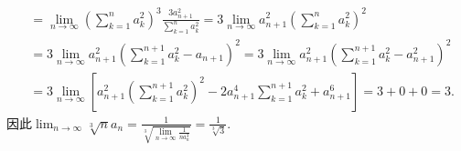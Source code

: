 \documentclass[../../main.tex]{subfiles}
\begin{document}
\begin{solution}
\begin{align*}
&=\lim_{n\rightarrow\infty}\left(\sum\limits_{k = 1}^n{a_{k}^{2}}\right)^3\frac{3a_{n + 1}^{2}}{\sum\limits_{k = 1}^n{a_{k}^{2}}}=3\lim_{n\rightarrow\infty}a_{n + 1}^{2}\left(\sum\limits_{k = 1}^n{a_{k}^{2}}\right)^2\\
&=3\lim_{n\rightarrow\infty}a_{n + 1}^{2}\left(\sum\limits_{k = 1}^{n + 1}{a_{k}^{2}}-a_{n + 1}\right)^2=3\lim_{n\rightarrow\infty}a_{n + 1}^{2}\left(\sum\limits_{k = 1}^{n + 1}{a_{k}^{2}}-a_{n + 1}^{2}\right)^2\\
&=3\lim_{n\rightarrow\infty}\left[a_{n + 1}^{2}\left(\sum\limits_{k = 1}^{n + 1}{a_{k}^{2}}\right)^2 - 2a_{n + 1}^{4}\sum\limits_{k = 1}^{n + 1}{a_{k}^{2}}+a_{n + 1}^{6}\right]=3 + 0 + 0 = 3.
\end{align*}
因此\(\lim_{n\rightarrow\infty}\sqrt[3]{n}a_n=\frac{1}{\sqrt[3]{\lim\limits_{n\rightarrow\infty}\frac{1}{na_{n}^{3}}}}=\frac{1}{\sqrt[3]{3}}\).
\end{solution}
\end{document}
